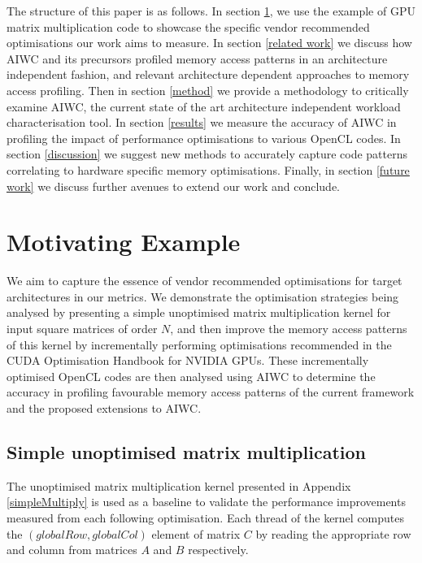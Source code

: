 \documentclass[review=false, sigchi]{acmart}
\begin{document}
	The structure of this paper is as follows. In section \ref{motivating example}, we use the example of GPU matrix multiplication code to showcase the specific vendor recommended optimisations our work aims to measure. In section \ref{related work} we discuss how AIWC and its precursors profiled memory access patterns in an architecture independent fashion, and relevant architecture dependent approaches to memory access profiling. Then in section \ref{method} we provide a methodology to critically examine AIWC, the current state of the art architecture independent workload characterisation tool. In section \ref{results} we measure the accuracy of AIWC in profiling the impact of performance optimisations to various OpenCL codes. In section \ref{discussion} we suggest new methods to accurately capture code patterns correlating to hardware specific memory optimisations. Finally, in section \ref{future work} we discuss further avenues to extend our work and conclude.
	
	\section{Motivating Example} \label{motivating example}
	
	We aim to capture the essence of vendor recommended optimisations for target architectures in our metrics. We demonstrate the optimisation strategies being analysed by presenting a simple unoptimised matrix multiplication kernel for input square matrices of order $N$, and then improve the memory access patterns of this kernel by incrementally performing optimisations recommended in the CUDA Optimisation Handbook \cite{cudaoptimisation} for NVIDIA GPUs. These incrementally optimised OpenCL codes are then analysed using AIWC to determine the accuracy in profiling favourable memory access patterns of the current framework and the proposed extensions to AIWC.
	
	\subsection{Simple unoptimised matrix multiplication}
	
	The unoptimised matrix multiplication kernel presented in Appendix \ref{simpleMultiply} is used as a baseline to validate the performance improvements measured from each following optimisation. Each thread of the kernel computes the $(globalRow, globalCol)$ element of matrix $C$ by reading the appropriate row and column from matrices $A$ and $B$ respectively.
	
\end{document}
